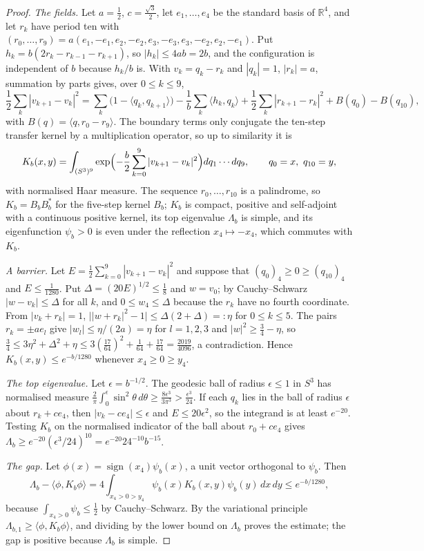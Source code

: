 \documentclass[11pt]{amsart}
\theoremstyle{definition}
\theoremstyle{remark}
\numberwithin{equation}{section}
\newcommand{\R}{\mathbb{R}}
\newcommand{\ip}[2]{\langle #1,#2\rangle}
\begin{document}
\begin{proof}
\emph{The fields.} Let $a=\frac12$, $c=\frac{\sqrt3}2$, let $e_1,\dots,e_4$ be
the standard basis of $\R^4$, and let $r_k$ have period ten with
$(r_0,\dots,r_9)=a(e_1,-e_1,e_2,-e_2,e_3,-e_3,e_3,-e_2,e_2,-e_1)$. Put
$h_k=b(2r_k-r_{k-1}-r_{k+1})$, so $|h_k|\le4ab=2b$, and the configuration is
independent of $b$ because $h_k/b$ is. With $v_k=q_k-r_k$ and
$|q_k|=1$, $|r_k|=a$, summation by parts gives, over $0\le k\le9$,
\[
\frac12\sum_k|v_{k+1}-v_k|^2=\sum_k\bigl(1-\ip{q_k}{q_{k+1}}\bigr)
-\frac1b\sum_k\ip{h_k}{q_k}+\frac12\sum_k|r_{k+1}-r_k|^2+B(q_0)-B(q_{10}),
\]
with $B(q)=\ip q{r_0-r_9}$. The boundary terms only conjugate the ten-step
transfer kernel by a multiplication operator, so up to similarity it is
\[
K_b(x,y)=\int_{(S^3)^9}\exp\Bigl(-\frac b2\sum_{k=0}^9|v_{k+1}-v_k|^2\Bigr)
dq_1\cdots dq_9,\qquad q_0=x,\ q_{10}=y,
\]
with normalised Haar measure. The sequence $r_0,\dots,r_{10}$ is a
palindrome, so $K_b=B_bB_b^*$ for the five-step kernel $B_b$; $K_b$ is
compact, positive and self-adjoint with a continuous positive kernel, its top
eigenvalue $\Lambda_b$ is simple, and its eigenfunction $\psi_b>0$ is even
under the reflection $x_4\mapsto-x_4$, which commutes with $K_b$.

\emph{A barrier.} Let $E=\frac12\sum_{k=0}^9|v_{k+1}-v_k|^2$ and suppose
that $(q_0)_4\ge0\ge(q_{10})_4$ and $E\le\frac1{1280}$. Put $\Delta=
(20E)^{1/2}\le\frac18$ and $w=v_0$; by Cauchy--Schwarz $|w-v_k|\le\Delta$ for
all $k$, and $0\le w_4\le\Delta$ because the $r_k$ have no fourth coordinate.
From $|v_k+r_k|=1$, $\bigl||w+r_k|^2-1\bigr|\le\Delta(2+\Delta)=:\eta$ for
$0\le k\le5$. The pairs $r_k=\pm ae_l$ give $|w_l|\le\eta/(2a)=\eta$ for
$l=1,2,3$ and $|w|^2\ge\frac34-\eta$, so $\frac34\le3\eta^2+\Delta^2+\eta\le
3(\frac{17}{64})^2+\frac1{64}+\frac{17}{64}=\frac{2019}{4096}$, a contradiction.
Hence $K_b(x,y)\le e^{-b/1280}$ whenever $x_4\ge0\ge y_4$.

\emph{The top eigenvalue.} Let $\epsilon=b^{-1/2}$. The geodesic ball of
radius $\epsilon\le1$ in $S^3$ has normalised measure $\frac2\pi\int_0^\epsilon
\sin^2\theta\,d\theta\ge\frac{8\epsilon^3}{3\pi^3}>\frac{\epsilon^3}{24}$. If
each $q_k$ lies in the ball of radius $\epsilon$ about $r_k+ce_4$, then
$|v_k-ce_4|\le\epsilon$ and $E\le20\epsilon^2$, so the integrand is at least
$e^{-20}$. Testing $K_b$ on the normalised indicator of the ball about
$r_0+ce_4$ gives $\Lambda_b\ge e^{-20}(\epsilon^3/24)^{10}=e^{-20}24^{-10}
b^{-15}$.

\emph{The gap.} Let $\phi(x)=\operatorname{sign}(x_4)\psi_b(x)$, a unit vector
orthogonal to $\psi_b$. Then
\[
\Lambda_b-\ip\phi{K_b\phi}=4\int_{x_4>0>y_4}\psi_b(x)K_b(x,y)\psi_b(y)\,dx\,dy
\le e^{-b/1280},
\]
because $\int_{x_4>0}\psi_b\le\frac12$ by Cauchy--Schwarz. By the
variational principle $\Lambda_{b,1}\ge\ip\phi{K_b\phi}$, and dividing by the
lower bound on $\Lambda_b$ proves the estimate; the gap is positive because
$\Lambda_b$ is simple.
\end{proof}
\end{document}
